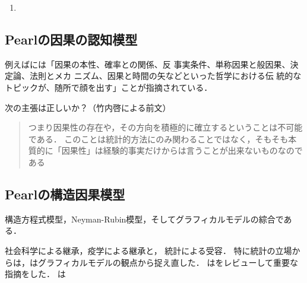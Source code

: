 \documentclass[uplatex,dvipdfmx]{jsreport}
\begin{document}
\begin{definition}
    
    \begin{enumerate}
        \item 
    \end{enumerate}
\end{definition}

\subsection{Pearlの因果の認知模型}

\begin{tcolorbox}[colframe=ForestGreen, colback=ForestGreen!10!white,breakable,colbacktitle=ForestGreen!40!white,coltitle=black,fonttitle=\bfseries\sffamily,
title=]
    例えば\cite{Pearl00-Causality}には「因果の本性、確率との関係、反
    事実条件、単称因果と般因果、決定論、法則とメカ
    ニズム、因果と時間の矢などといった哲学における伝        
    統的なトピックが、随所で顔を出す」ことが指摘されている\cite{大塚淳-書評-Causality}．
\end{tcolorbox}

\begin{issue}
    次の主張は正しいか？（竹内啓による前文\cite{統計科学のフロンティア5}）
    \begin{quote}
        つまり因果性の存在や，その方向を積極的に確立するということは不可能である．
        このことは統計的方法にのみ関わることではなく，そもそも本質的に「因果性」は経験的事実だけからは言うことが出来ないものなのである\cite{統計科学のフロンティア5}
    \end{quote}
\end{issue}

\subsection{Pearlの構造因果模型}

\begin{tcolorbox}[colframe=ForestGreen, colback=ForestGreen!10!white,breakable,colbacktitle=ForestGreen!40!white,coltitle=black,fonttitle=\bfseries\sffamily,
title=]
    構造方程式模型，Neyman-Rubin模型，そしてグラフィカルモデル\cite{Pearl88-IntelligentSystem}の綜合である．
\end{tcolorbox}

\begin{history}
    社会科学による継承\cite{Morgan-Winship14}，疫学による継承\cite{Greenland-Pearl-Robins99}と，
    統計による受容\cite{Cox-Wermuth04-review}．
    特に統計の立場からは，\cite{Lauritzen00-Graphical}はグラフィカルモデルの観点から捉え直した．
    \cite{Lindley02-SeeingAndDoing}は\cite{Pearl00-Causality}をレビューして重要な指摘をした．
    \cite{Dawid02-InfluenceDiagram}は
\end{history}
\end{document}
